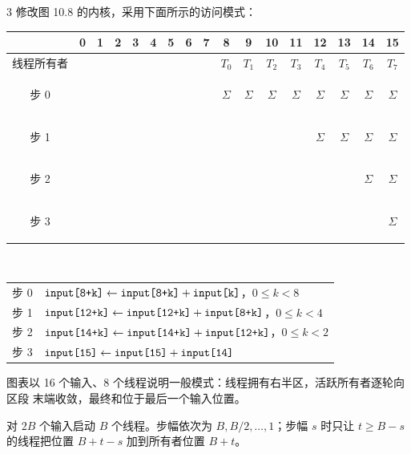 \begin{solutionexercise}{3}
\problemheading 修改图 10.8 的内核，采用下面所示的访问模式：
\begin{center}
\scriptsize
\setlength{\tabcolsep}{2.2pt}
\begin{tabular}{c|*{16}{c}}
  &0&1&2&3&4&5&6&7&8&9&10&11&12&13&14&15\\\hline
  线程所有者&&&&&&&&&$T_0$&$T_1$&$T_2$&$T_3$&$T_4$&$T_5$&$T_6$&$T_7$\\
  步 0&&&&&&&&&\colorbox{blue!25}{\strut$\Sigma$}&\colorbox{blue!25}{\strut$\Sigma$}&
    \colorbox{blue!25}{\strut$\Sigma$}&\colorbox{blue!25}{\strut$\Sigma$}&
    \colorbox{blue!25}{\strut$\Sigma$}&\colorbox{blue!25}{\strut$\Sigma$}&
    \colorbox{blue!25}{\strut$\Sigma$}&\colorbox{blue!25}{\strut$\Sigma$}\\
  步 1&&&&&&&&&&&&&\colorbox{blue!25}{\strut$\Sigma$}&
    \colorbox{blue!25}{\strut$\Sigma$}&\colorbox{blue!25}{\strut$\Sigma$}&
    \colorbox{blue!25}{\strut$\Sigma$}\\
  步 2&&&&&&&&&&&&&&&\colorbox{blue!25}{\strut$\Sigma$}&
    \colorbox{blue!25}{\strut$\Sigma$}\\
  步 3&&&&&&&&&&&&&&&&\colorbox{blue!25}{\strut$\Sigma$}
\end{tabular}
\\[0.35em]
\begin{tabular}{c@{\quad}l}
  步 0 & $\code{input[8+k]}\leftarrow\code{input[8+k]}+\code{input[k]}$，$0\le k<8$\\
  步 1 & $\code{input[12+k]}\leftarrow\code{input[12+k]}+\code{input[8+k]}$，$0\le k<4$\\
  步 2 & $\code{input[14+k]}\leftarrow\code{input[14+k]}+\code{input[12+k]}$，$0\le k<2$\\
  步 3 & $\code{input[15]}\leftarrow\code{input[15]}+\code{input[14]}$
\end{tabular}
\end{center}
图表以 16 个输入、8 个线程说明一般模式：线程拥有右半区，活跃所有者逐轮向区段
末端收敛，最终和位于最后一个输入位置。

\approachheading 对 $2B$ 个输入启动 $B$ 个线程。步幅依次为 $B,B/2,\ldots,1$；步幅
$s$ 时只让 $t\ge B-s$ 的线程把位置 $B+t-s$ 加到所有者位置 $B+t$。


\end{solutionexercise}
